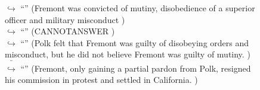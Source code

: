 \documentclass[11pt,a4paper, onecolumn]{article}
\begin{document}
\begin{figure}[t] \small \begin{tcolorbox}[boxsep=0pt,left=5pt,right=0pt,top=2pt,colback = yellow!5] \begin{dialogue}
 \small 
\colorbox{pink!25}{$\hookrightarrow$}
{ ``'' (Fremont was convicted of mutiny, disobedience of a superior officer and military misconduct ) }
\\
\colorbox{pink!25}{$\hookrightarrow$}
{ ``'' (CANNOTANSWER ) }
\\
\colorbox{pink!25}{$\hookrightarrow$}
{ ``'' (Polk felt that Fremont was guilty of disobeying orders and misconduct, but he did not believe Fremont was guilty of mutiny. ) }
\\
\colorbox{pink!25}{ $\bar{\hookrightarrow}$}
{ ``'' (Fremont, only gaining a partial pardon from Polk, resigned his commission in protest and settled in California. ) }
\\
 \end{dialogue}\end{tcolorbox}\end{figure}
\end{document}
